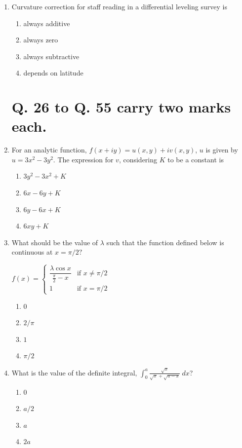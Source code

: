 \documentclass[journal,12pt,onecolumn]{IEEEtran}
\theoremstyle{remark}
\begin{document}
\begin{enumerate}
\item Curvature correction for staff reading in a differential leveling survey is

\hfill{}
\begin{enumerate}
\item always additive
\item always zero
\item always subtractive
\item depends on latitude
\end{enumerate}

\section*{Q. 26 to Q. 55 carry two marks each.}

\item For an analytic function, $f(x+iy) = u(x, y) + iv(x, y)$, $u$ is given by $u = 3x^2 - 3y^2$. The expression for $v$, considering $K$ to be a constant is

\hfill{}
\begin{enumerate}
\item $3y^2 - 3x^2 + K$
\item $6x - 6y + K$
\item $6y - 6x + K$
\item $6xy + K$
\end{enumerate}

\item What should be the value of $\lambda$ such that the function defined below is continuous at $x = \pi/2?$

\hfill{}
$f(x) = 
\begin{cases}
\dfrac{\lambda \cos x}{\frac{\pi}{2} - x} & \text{if } x \neq \pi/2 \\
1 & \text{if } x = \pi/2
\end{cases}$
\begin{enumerate}[label=(\Alph*)]
\item $0$
\item $2/\pi$
\item $1$
\item $\pi/2$
\end{enumerate}

\item What is the value of the definite integral, $\displaystyle\int_0^a \frac{\sqrt{x}}{\sqrt{x} + \sqrt{a-x}}\ dx$?

\hfill{}
\begin{enumerate}
\item $0$
\item $a/2$
\item $a$
\item $2a$
\end{enumerate}


\end{enumerate}
\end{document}
